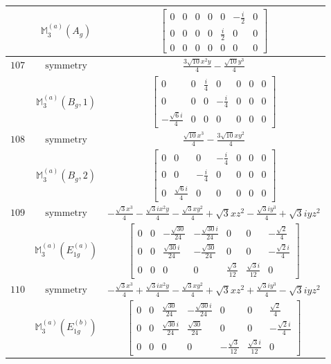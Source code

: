 \documentclass[fleqn,8pt,landscape]{jsarticle}
\begin{document}
\begin{longtable}{ccc}
$  $ & $ \mathbb{M}_{3}^{(a)}(A_{g}) $ & $ \begin{bmatrix} 0 & 0 & 0 & 0 & 0 & - \frac{i}{2} & 0 \\ 0 & 0 & 0 & 0 & \frac{i}{2} & 0 & 0 \\ 0 & 0 & 0 & 0 & 0 & 0 & 0 \end{bmatrix} $ \\ \hline
$ 107 $ & $ \text{symmetry} $ & $ \frac{3 \sqrt{10} x^{2} y}{4} - \frac{\sqrt{10} y^{3}}{4} $ \\
$  $ & $ \mathbb{M}_{3}^{(a)}(B_{g},1) $ & $ \begin{bmatrix} 0 & 0 & \frac{i}{4} & 0 & 0 & 0 & 0 \\ 0 & 0 & 0 & - \frac{i}{4} & 0 & 0 & 0 \\ - \frac{\sqrt{6} i}{4} & 0 & 0 & 0 & 0 & 0 & 0 \end{bmatrix} $ \\ \hline
$ 108 $ & $ \text{symmetry} $ & $ \frac{\sqrt{10} x^{3}}{4} - \frac{3 \sqrt{10} x y^{2}}{4} $ \\
$  $ & $ \mathbb{M}_{3}^{(a)}(B_{g},2) $ & $ \begin{bmatrix} 0 & 0 & 0 & - \frac{i}{4} & 0 & 0 & 0 \\ 0 & 0 & - \frac{i}{4} & 0 & 0 & 0 & 0 \\ 0 & \frac{\sqrt{6} i}{4} & 0 & 0 & 0 & 0 & 0 \end{bmatrix} $ \\ \hline
$ 109 $ & $ \text{symmetry} $ & $ - \frac{\sqrt{3} x^{3}}{4} - \frac{\sqrt{3} i x^{2} y}{4} - \frac{\sqrt{3} x y^{2}}{4} + \sqrt{3} x z^{2} - \frac{\sqrt{3} i y^{3}}{4} + \sqrt{3} i y z^{2} $ \\
$  $ & $ \mathbb{M}_{3}^{(a)}(E_{1g}^{(a)}) $ & $ \begin{bmatrix} 0 & 0 & - \frac{\sqrt{30}}{24} & - \frac{\sqrt{30} i}{24} & 0 & 0 & - \frac{\sqrt{2}}{4} \\ 0 & 0 & \frac{\sqrt{30} i}{24} & - \frac{\sqrt{30}}{24} & 0 & 0 & - \frac{\sqrt{2} i}{4} \\ 0 & 0 & 0 & 0 & \frac{\sqrt{3}}{12} & \frac{\sqrt{3} i}{12} & 0 \end{bmatrix} $ \\ \hline
$ 110 $ & $ \text{symmetry} $ & $ - \frac{\sqrt{3} x^{3}}{4} + \frac{\sqrt{3} i x^{2} y}{4} - \frac{\sqrt{3} x y^{2}}{4} + \sqrt{3} x z^{2} + \frac{\sqrt{3} i y^{3}}{4} - \sqrt{3} i y z^{2} $ \\
$  $ & $ \mathbb{M}_{3}^{(a)}(E_{1g}^{(b)}) $ & $ \begin{bmatrix} 0 & 0 & \frac{\sqrt{30}}{24} & - \frac{\sqrt{30} i}{24} & 0 & 0 & \frac{\sqrt{2}}{4} \\ 0 & 0 & \frac{\sqrt{30} i}{24} & \frac{\sqrt{30}}{24} & 0 & 0 & - \frac{\sqrt{2} i}{4} \\ 0 & 0 & 0 & 0 & - \frac{\sqrt{3}}{12} & \frac{\sqrt{3} i}{12} & 0 \end{bmatrix} $ \\ \hline

\end{longtable}
\end{document}
